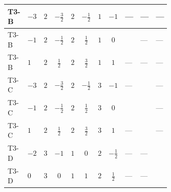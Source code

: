 \documentclass[8pt]{article}
\begin{document}
\begin{landscape}
\begin{longtable}{@{}llcccccc >{\raggedright\arraybackslash}p{0.21\linewidth} >{\raggedright\arraybackslash}p{0.21\linewidth} >{\raggedright\arraybackslash}p{0.21\linewidth}@{}}
\midrule
T3-B & $-3$ & $2$ & $-\frac{3}{2}$ & $2$ & $-\frac{1}{2}$ & $1$ & $-1$ & --- & --- & --- \\
\midrule
T3-B & $-1$ & $2$ & $-\frac{1}{2}$ & $2$ & $\frac{1}{2}$ & $1$ & $0$ & \scriptsize\adjustbox{max width=\linewidth}{$\begin{gathered} -8 \operatorname{Tr}\!\left({M_F}\,\left({y_2}\right)^{\dagger}\,{y_2}\,\left({M_F}\right)^{*}\right)\end{gathered}$} & --- & --- \\
\midrule
T3-B & $1$ & $2$ & $\frac{1}{2}$ & $2$ & $\frac{3}{2}$ & $1$ & $1$ & --- & --- & --- \\
\midrule
T3-C & $-3$ & $2$ & $-\frac{3}{2}$ & $2$ & $-\frac{1}{2}$ & $3$ & $-1$ & --- & \scriptsize\adjustbox{max width=\linewidth}{$\begin{gathered} {m_2^2} (3 T_{\nu}^{(2)}+6 {\lambda_{S_2}^{(1)}})\end{gathered}$} & --- \\
\midrule
T3-C & $-1$ & $2$ & $-\frac{1}{2}$ & $2$ & $\frac{1}{2}$ & $3$ & $0$ & \scriptsize\adjustbox{max width=\linewidth}{$\begin{gathered} -12 \operatorname{Tr}\!\left({M_F}\,\left({y_2}\right)^{\dagger}\,{y_2}\,\left({M_F}\right)^{*}\right)\end{gathered}$} & \scriptsize\adjustbox{max width=\linewidth}{$\begin{gathered} {m_2^2} (3 T_{\nu}^{(2)}+6 {\lambda_{S_2}^{(1)}})\end{gathered}$} & --- \\
\midrule
T3-C & $1$ & $2$ & $\frac{1}{2}$ & $2$ & $\frac{3}{2}$ & $3$ & $1$ & --- & \scriptsize\adjustbox{max width=\linewidth}{$\begin{gathered} {m_2^2} (3 T_{\nu}^{(2)}+6 {\lambda_{S_2}^{(1)}})\end{gathered}$} & --- \\
\midrule
T3-D & $-2$ & $3$ & $-1$ & $1$ & $0$ & $2$ & $-\frac{1}{2}$ & --- & --- & \scriptsize\adjustbox{max width=\linewidth}{$\begin{gathered} {m_2^2} (4 T_{\nu}^{(2)}+4 {\lambda_{S_2}^{(1)}})\end{gathered}$} \\
\midrule
T3-D & $0$ & $3$ & $0$ & $1$ & $1$ & $2$ & $\frac{1}{2}$ & --- & --- & \scriptsize\adjustbox{max width=\linewidth}{$\begin{gathered} {m_2^2} (4 T_{\nu}^{(2)}+4 {\lambda_{S_2}^{(1)}})\end{gathered}$} \\

\end{longtable}
\end{landscape}
\end{document}
